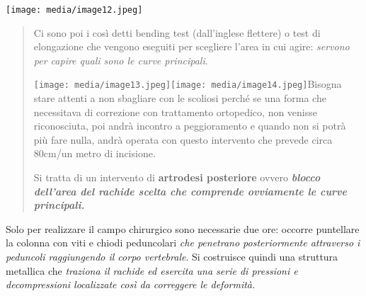 \documentclass[]{article}
\begin{document}
\texttt{[image: media/image12.jpeg]}

\begin{quote}
Ci sono poi i così detti bending test (dall'inglese flettere) o test di
elongazione che vengono eseguiti per scegliere l'area in cui agire:
\emph{servono per capire quali sono le curve principali}.

\texttt{[image: media/image13.jpeg]}\texttt{[image: media/image14.jpeg]}Bisogna
stare attenti a non sbagliare con le scoliosi perché se una forma che
necessitava di correzione con trattamento ortopedico, non venisse
riconosciuta, poi andrà incontro a peggioramento e quando non si potrà
più fare nulla, andrà operata con questo intervento che prevede circa
80cm/un metro di incisione.

Si tratta di un intervento di \textbf{artrodesi posteriore} ovvero
\textbf{\emph{blocco dell'area del rachide scelta che comprende
ovviamente le curve principali. }}
\end{quote}

Solo per realizzare il campo chirurgico sono necessarie due ore: occorre
puntellare la colonna con viti e chiodi peduncolari \emph{che penetrano
posteriormente attraverso i peduncoli raggiungendo il corpo vertebrale}.
Si costruisce quindi una struttura metallica che \emph{traziona il
rachide ed esercita una serie di pressioni e decompressioni localizzate
così da correggere le deformità.}
\end{document}
